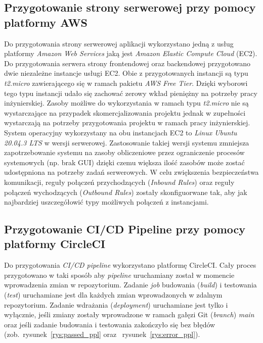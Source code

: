	\subsection{Przygotowanie strony serwerowej przy pomocy platformy AWS}
	Do przygotowania strony serwerowej aplikacji wykorzystano jedną z usług platformy \textit{Amazon Web Services} jaką jest \textit{Amazon Elastic Compute Cloud} (EC2). Do przygotowania serwera strony frontendowej oraz backendowej przygotowano dwie niezależne instancje usługi EC2. Obie z przygotowanych instancji są typu \textit{t2.micro} zawierającego się w ramach pakietu \textit{AWS Free Tier}. Dzięki wyborowi tego typu instancji udało się zachować zerowy wkład pieniężny na potrzeby pracy inżynierskiej. Zasoby możliwe do wykorzystania w ramach typu \textit{t2.micro} nie są wystarczające na przypadek skomercjalizowania projektu jednak w zupełności wystarczają na potrzeby przygotowania projektu w ramach pracy inżynierskiej.
System operacyjny wykorzystany na obu instancjach EC2 to \textit{Linux Ubuntu 20.04.3 LTS} w wersji serwerowej. Zastosowanie takiej wersji systemu zmniejsza zapotrzebowanie systemu na zasoby obliczeniowe przez ograniczenie procesów systemowych (np. brak GUI) dzięki czemu większa ilość zasobów może zostać udostępniona na potrzeby zadań serwerowych. W celu zwiększenia bezpieczeństwa komunikacji, reguły połączeń przychodzących (\textit{Inbound Rules}) oraz reguły połączeń wychodzących (\textit{Outbound Rules}) zostały skonfiguorwane tak, aby jak najbardziej uszczegółowić typy możliwych połączeń z instancjami.
	
	\subsection{Przygotowanie CI/CD Pipeline przy pomocy platformy CircleCI}
	Do przygotowania \textit{CI/CD pipeline} wykorzystano platformę CircleCI. Cały proces przygotowano w taki sposób aby \textit{pipeline} uruchamiany został w momencie wprowadzenia zmian w repozytorium. Zadanie \textit{job} budowania (\textit{build}) i testowania (\textit{test}) uruchamiane jest dla każdych zmian wprowadzonych w zdalnym repozytorium. Zadanie wdrażania (\textit{deployment}) uruchamiane jest tylko i wyłącznie, jeśli zmiany zostały wprowadzone w ramach gałęzi Git (\textit{branch}) \textit{main} oraz jeśli zadanie budowania i testowania zakończyło się bez błędów (zob.~rysunek~\ref{rys:passed_ppl} oraz ~rysunek~\ref{rys:error_ppl}).


